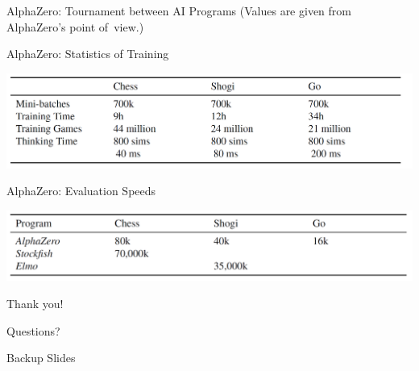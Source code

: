\documentclass{beamer}
\begin{document}
{\begin{frame}{AlphaZero: Tournament between AI Programs}
      {\tiny (Values are given from AlphaZero's point of~view.)}
    \end{frame}

    \begin{frame}{AlphaZero: Statistics of Training}
      \begin{center}
        \includegraphics[width=\textwidth]{../img/AlphaZero-paper/statistics-of-AlphaZero-training.png}
      \end{center}
    \end{frame}

    \begin{frame}{AlphaZero: Evaluation Speeds}
      \begin{center}
        \includegraphics[width=\textwidth]{../img/AlphaZero-paper/evaluation-speed-of-AlphaZero.png}
      \end{center}
    \end{frame}
  }

  \begin{frame}[standout]
    \begin{center}
      Thank you!

      Questions?
    \end{center}
  \end{frame}

  \begin{frame}[standout]
    Backup Slides
  \end{frame}
\end{document}
